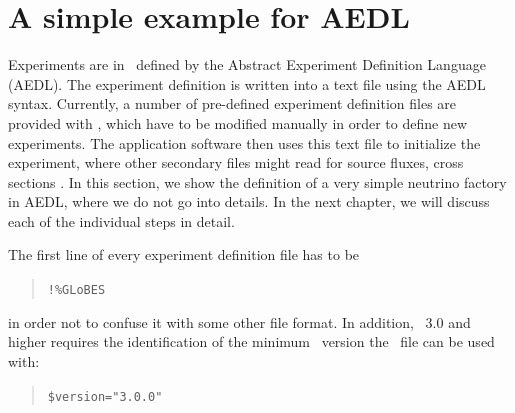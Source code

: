 \section{A simple example for AEDL}

Experiments are in \GLOBES\ defined by the Abstract Experiment Definition Language (AEDL). The experiment definition is written into a text file using the AEDL syntax. Currently, a number of pre-defined experiment definition files are provided with \GLOBES , which have to be modified manually in order to define new experiments.  The application software then uses this text file to initialize the experiment, where other secondary files might read for source fluxes, cross sections \etc . In this section, we show the definition of a very simple neutrino factory in AEDL, where we do not go into details. In the next chapter, we will discuss each of the individual steps in detail.

The first line of every experiment definition file has to be
\begin{quote}
{\tt !\%GLoBES}
\end{quote}
in order not to confuse it with some other file format.
In addition, \GLOBES\ 3.0 and higher requires the identification of the
minimum \GLOBES\ version the \AEDL\ file can be used with:
\begin{quote}
{\tt \$version="3.0.0"}
\end{quote}


